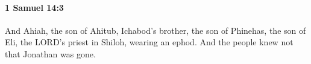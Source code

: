 
		\paragraph{1 Samuel 14:3} %
			\label{1SAMUEL-14-3}

			And Ahiah, the son of Ahitub, Ichabod’s brother, the son of Phinehas, the son of Eli, the LORD’s priest in Shiloh, wearing an ephod. And the people knew not that Jonathan was gone.


